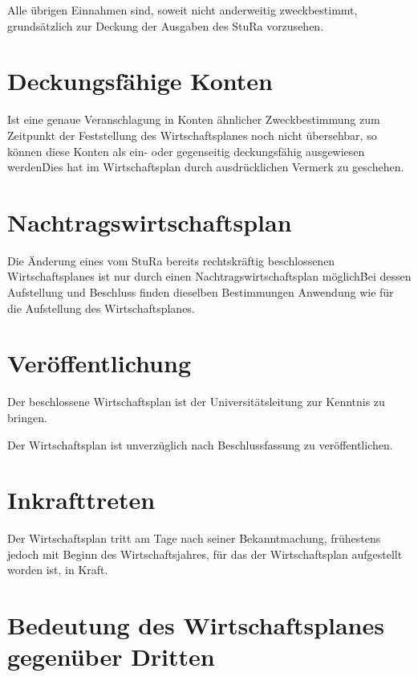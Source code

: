 {\begin{multicols}{2}
\Abs \Satz Alle übrigen Einnahmen sind, soweit nicht anderweitig zweckbestimmt, grundsätzlich zur Deckung der Ausgaben des StuRa vorzusehen.



\section{Deckungsfähige Konten}

\Abs \Satz Ist eine genaue Veranschlagung in Konten ähnlicher Zweckbestimmung zum Zeitpunkt der Feststellung des Wirtschaftsplanes noch nicht übersehbar, so können diese Konten als ein- oder gegenseitig deckungsfähig ausgewiesen werden\. Dies hat im Wirtschaftsplan durch ausdrücklichen Vermerk zu geschehen.



\section{Nachtragswirtschaftsplan}

\Abs \Satz Die Änderung eines vom StuRa bereits rechtskräftig beschlossenen Wirtschaftsplanes ist nur durch einen Nachtragswirtschaftsplan möglich\. Bei dessen Aufstellung und Beschluss finden dieselben Bestimmungen Anwendung wie für die Aufstellung des Wirtschaftsplanes.



\section{Veröffentlichung}

\Abs \Satz Der beschlossene Wirtschaftsplan ist der Universitätsleitung zur Kenntnis zu bringen.

\Abs \Satz Der Wirtschaftsplan ist unverzüglich nach Beschlussfassung zu veröffentlichen.



\section{Inkrafttreten}

\Abs \Satz Der Wirtschaftsplan tritt am Tage nach seiner Bekanntmachung, frühestens jedoch mit Beginn des Wirtschaftsjahres, für das der Wirtschaftsplan aufgestellt worden ist, in Kraft.



\section{Bedeutung des Wirtschaftsplanes gegenüber Dritten}


\end{multicols}}
